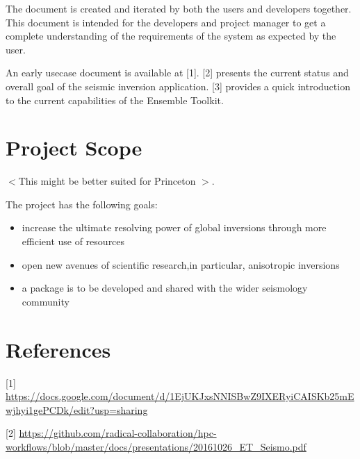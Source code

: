 \documentclass{scrreprt}
\begin{document}
The document is created and iterated by both the users and developers together. This document is intended for the developers and project manager to get a complete understanding of the requirements of the system as expected by the user.

An early usecase document is available at [1]. [2] presents the current status and overall goal of the seismic inversion application. [3] provides a quick introduction to the current capabilities of the Ensemble Toolkit.

\section{Project Scope}

$<$This might be better suited for Princeton $>$.

The project has the following goals:

\begin{itemize}[noitemsep]
\item increase the ultimate resolving power of global inversions through more efficient use of resources
\item open new avenues of scientific research,in particular, anisotropic inversions
\item a package is to be developed and shared with the wider seismology community
\end{itemize}

\section{References}

[1] \url{https://docs.google.com/document/d/1EjUKJxsNNISBwZ9IXERyiCAISKb25mEwjhyi1gePCDk/edit?usp=sharing}

[2] \url{https://github.com/radical-collaboration/hpc-workflows/blob/master/docs/presentations/20161026_ET_Seismo.pdf}
\end{document}
